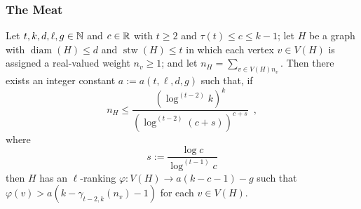 \documentclass[kpfonts]{patmorin}
\DeclareMathOperator{\diam}{diam}
\DeclareMathOperator{\stw}{stw}
\newcommand{\trn}{\chi_2}
\theoremstyle{named}
\newcommand{\weirdref}[2]{\cref{#1}#2}
\begin{document}
\subsubsection{The Meat}

%

\begin{lem}\label{t-tree-slack}

Let $t,k,d,\ell,g\in\mathbb{N}$ and $c\in\mathbb{R}$ with $t\ge 2$ and $\tau(t)\le c\le k-1$; let $H$ be a graph with $\diam(H)\le d$ and $\stw(H)\le t$ in which each vertex $v\in V(H)$ is assigned a real-valued weight $n_v\ge 1$; and let $n_H=\sum_{v\in V(H) n_v}$.
Then there exists an integer constant $a:=a(t,\ell,d,g)$ such that,
if
\begin{equation}
     n_H \le \frac{(\log^{(t-2)} k)^k}{\left(\log^{(t-2)} (c + s)\right)^{c+s}} \enspace ,
 \label{total-weight-i}
\end{equation}
where
\[
    s := \frac{\log c}{\log^{(t-1)} c}
\]
then $H$ has an $\ell$-ranking $\varphi:V(H)\to a(k-c-1)-g$ such that $\varphi(v)> a(k-\gamma_{t-2,k}(n_v)-1)$ for each $v\in V(H)$.
\end{lem}
\end{document}

